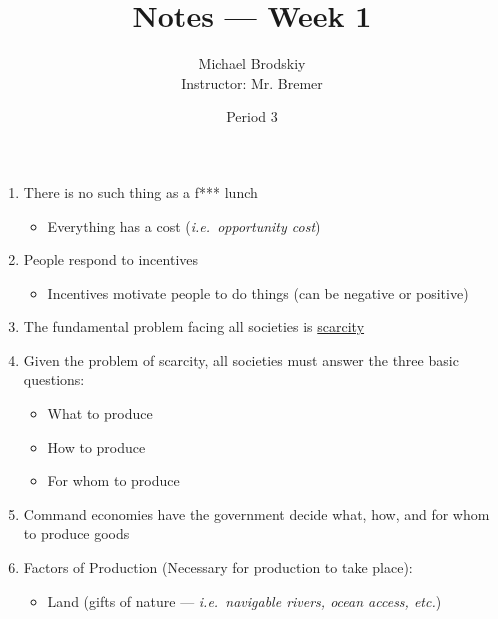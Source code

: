\documentclass[12pt]{article}
\title{Notes — Week 1}
\date{Period 3}
\author{Michael Brodskiy\\ \small Instructor: Mr. Bremer}
\begin{document}
\maketitle

\begin{enumerate}

  \item There is no such thing as a f*** lunch

    \begin{itemize}

      \item Everything has a cost (\textit{i.e.\ opportunity cost})

    \end{itemize}

  \item People respond to incentives

    \begin{itemize}

      \item Incentives motivate people to do things (can be negative or positive)

    \end{itemize}

  \item The fundamental problem facing all societies is \underline{scarcity}

  \item Given the problem of scarcity, all societies must answer the three basic questions:

    \begin{itemize}

      \item What to produce

      \item How to produce

      \item For whom to produce

    \end{itemize}

  \item Command economies have the government decide what, how, and for whom to produce goods

  \item Factors of Production (Necessary for production to take place):

    \begin{itemize}

      \item Land (gifts of nature — \textit{i.e.\ navigable rivers, ocean access, etc.})


\end{itemize}
\end{enumerate}
\end{document}
